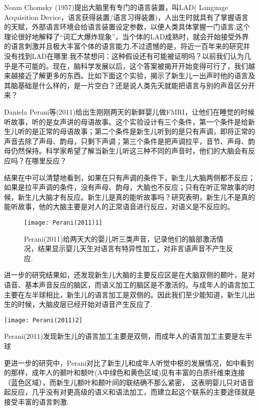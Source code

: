 Noam Chomsky (1957)提出大脑里有专门的语言装置，叫LAD( Language Acquisition Device，语言获得装置/语言习得装置)，人出生时就具有了掌握语言的天赋，外部语言环境会给语言装置设定参数，以便人类具体掌握一门语言.这个理论很好地解释了“词汇大爆炸现象”，当个体的LAD成熟时，就会开始接受外界的语言刺激并且极大丰富个体的语言能力.不过遗憾的是，将近一百年来的研究并没有找到LAD在哪里.我不禁想问：这种假设还有可能被证明吗？以前我们认为几乎是不可能的。现在，脑科学发展以后，这个答案被揭开开始变得可行了，我们越来越接近了解更多的东西。比如下面这个实验，揭示了新生儿一出声时他的语言及其脑基础是什么样的，是一片空白？还是说人类先天就能把语言与别的声音区分开来？

Daniela Perani等(2011)给出生刚刚两天的新鲜婴儿做FMRI，让他们在睡觉的时候听故事，听的是女声讲的母语故事。这个实验设计有三个条件，第一个条件是给新生儿听的是正常的母语故事；第二个条件是新生儿听到的是只有声调，即将正常的声音去除了声母、韵母，只剩下声调；第三个条件是把声调拉平，音节、声母、韵母仍然保持。科学家希望了解当新生儿听这三种不同的声音时，他们的大脑会有反应吗？在哪里反应？

结果在中可以清楚地看到，如果在只有声调的条件下，新生儿大脑两侧都不反应；如果是拉平声调的条件，没有声母、韵母，大脑也不反应；只有在听正常故事的时候，新生儿大脑才有反应。新生儿是真的能听故事吗？研究表明，新生儿不是真的能听故事，他的大脑主要是对人的正常语音进行反应，对语义是不反应的。

\begin{figure*}
	\texttt{[image: Perani(2011)1]}
	\caption[Perani(2011)1]{Perani(2011)给两天大的婴儿听三类声音，记录他们的脑部激活情况，结果显示婴儿天生对语言有特异性加工，对非言语声音不产生反应.}
\end{figure*}

进一步的研究结果如，还发现新生儿大脑的主要反应区是在大脑双侧的颞叶，是对语音、基本声音反应的脑区，而语义加工的脑区是不激活的。与成年人的语言加工主要在左半球相比，新生儿的语言加工是双侧的。因此我们至少能知道，新生儿出生的时候，大脑皮层已经开始对语音产生反应了.

\begin{marginfigure}
	\texttt{[image: Perani(2011)2]}
	\caption[Perani(2011)2]{Perani(2011)发现新生儿的语言加工主要是双侧，而成年人的语言加工主要是左半球}
\end{marginfigure}

更进一步的研究中，Perani对比了新生儿和成年人听觉中枢的发展情况，如中看到的那样，成年人的颞叶和额叶(A中绿色和黄色区域)见有丰富的白质纤维束连接（蓝色区域），而新生儿额叶和颞叶间的联结确不那么紧密， 这表明婴儿只对语音起反应，几乎没有对更高级的语义和语法加工，而建立起这个联系的主要途径就是接受丰富的语言刺激.

